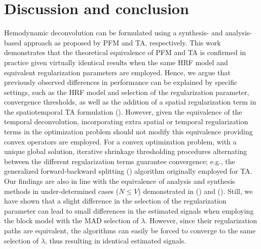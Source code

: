 
\section{Discussion and conclusion}

Hemodynamic deconvolution can be formulated using a synthesis- and analysis-based approach as proposed by PFM and TA, respectively. This work demonstrates that the theoretical equivalence of PFM and TA is confirmed in practice given virtually identical results when the same HRF model and equivalent regularization parameters are employed. Hence, we argue that previously observed differences in performance can be explained by specific settings, such as the HRF model and selection of the regularization parameter, convergence thresholds, as well as the addition of a spatial regularization term in the spatiotemporal TA formulation (\citealt{Karahanoglu2013TotalactivationfMRI}). However, given the equivalence of the temporal deconvolution, incorporating extra spatial or temporal regularization terms in the optimization problem should not modify this equivalence providing convex operators are employed. For a convex optimization problem, with a unique global solution, iterative shrinkage thresholding procedures alternating between the different regularization terms guarantee convergence; e.g., the generalized forward-backward splitting (\citealt{Raguet2013GeneralizedForwardBackward}) algorithm originally employed for TA. Our findings are also in line with the equivalence of analysis and synthesis methods in under-determined cases (\(N \leq V\)) demonstrated in (\citealt{Elad2007Analysisversussynthesis}) and (\citealt{ortelli2019synthesis}). Still, we have shown that a slight difference in the selection of the regularization parameter can lead to small differences in the estimated signals when employing the block model with the MAD selection of $\lambda$. However, since their regularization paths are equivalent, the algorithms can easily be forced to converge to the same selection of $\lambda$, thus resulting in identical estimated signals.

